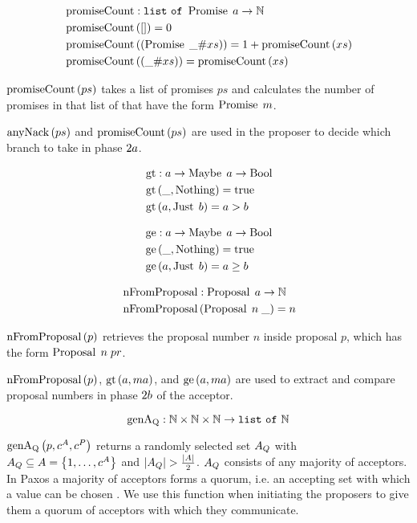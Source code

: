 \begin{align*}
&\operatorname{promiseCount} : \mathtt{list\ of\ } \operatorname{Promise}\; a \to \mathbb{N}\\
&\operatorname{promiseCount}\left(\mathtt{[]}\right) = 0\\
&\operatorname{promiseCount}\left(\left(\operatorname{Promise}\; \mathtt{\_} \mathtt{\#} xs\right)\right) = 1 + \operatorname{promiseCount}\left(xs\right)\\
&\operatorname{promiseCount}\left(\left(\mathtt{\_} \mathtt{\#} xs\right)\right) = \operatorname{promiseCount}\left(xs\right)
\end{align*}

$\operatorname{promiseCount}\left(ps\right)$ takes a list of promises $ps$ and calculates the number of promises in that list of that have the form $\operatorname{Promise}\; m$.

$\operatorname{anyNack}\left(ps\right)$ and $\operatorname{promiseCount}\left(ps\right)$ are used in the proposer to decide which branch to take in phase $2a$.

\begin{align*}    
&\operatorname{gt} : a \to \operatorname{Maybe}\; a \to \operatorname{Bool}\\
&\operatorname{gt}\left(\mathtt{\_}, \operatorname{Nothing}\right) = \operatorname{true}\\
&\operatorname{gt}\left(a, \operatorname{Just}\; b\right) = a > b
\end{align*}

\begin{align*}
&\operatorname{ge} : a \to \operatorname{Maybe}\; a \to \operatorname{Bool}\\
&\operatorname{ge}\left(\mathtt{\_}, \operatorname{Nothing}\right) = \operatorname{true}\\
&\operatorname{ge}\left(a, \operatorname{Just}\; b\right) = a \ge b
\end{align*}

\begin{align*}    
&\operatorname{nFromProposal} : \operatorname{Proposal}\; a \to \mathbb{N}\\
&\operatorname{nFromProposal}\left(\operatorname{Proposal}\; n\; \mathtt{\_} \right) = n
\end{align*}

$\operatorname{nFromProposal}\left(p \right)$ retrieves the proposal number $n$ inside proposal $p$, which has the form $\operatorname{Proposal}\; n\; pr$.

$\operatorname{nFromProposal}\left(p \right)$, $\operatorname{gt}\left(a, ma\right)$, and $\operatorname{ge}\left(a, ma\right)$ are used to extract and compare proposal numbers in phase $2b$ of the acceptor.

\[\operatorname{genA_Q} : \mathbb{N} \times \mathbb{N} \times \mathbb{N} \to \mathtt{list\ of\ } \mathbb{N}\]

$\operatorname{genA_Q}\left(p, c^A, c^P\right)$ returns a randomly selected set $A_Q$ with $A_Q \subseteq A = \left\{1, \dots, c^A\right\}$ and $|A_Q| > \frac{|A|}{2}$.
$A_Q$ consists of any majority of acceptors.
In Paxos a majority of acceptors forms a quorum, i.e. an accepting set with which a value can be chosen \cite{lower_bounds}.
We use this function when initiating the proposers to give them a quorum of acceptors with which they communicate.

